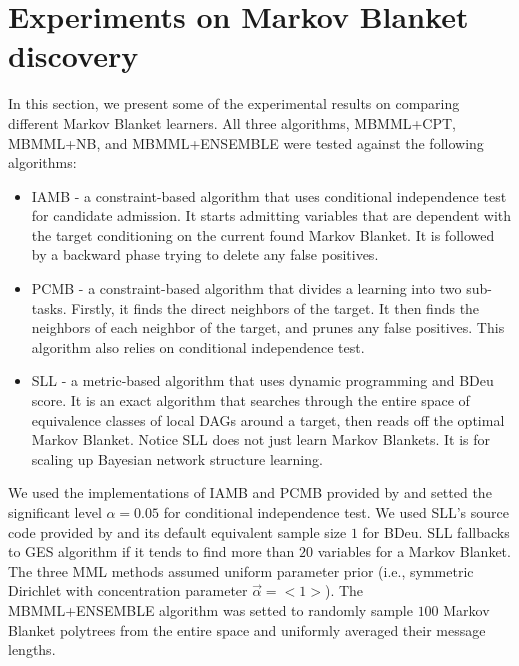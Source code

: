 \documentclass{svmult}
\begin{document}
\section{Experiments on Markov Blanket discovery}
In this section, we present some of the experimental results on comparing different Markov Blanket learners. All three algorithms, MBMML+CPT, MBMML+NB, and MBMML+ENSEMBLE were tested against the following algorithms: 
\begin{itemize}
\item IAMB - a constraint-based algorithm that uses conditional independence test for candidate admission. It starts admitting variables that are dependent with the target conditioning on the current found Markov Blanket. It is followed by a backward phase trying to delete any false positives.  
\item PCMB - a constraint-based algorithm that divides a learning into two sub-tasks. Firstly, it finds the direct neighbors of the target. It then finds the neighbors of each neighbor of the target, and prunes any false positives. This algorithm also relies on conditional independence test. 
\item SLL - a metric-based algorithm that uses dynamic programming and BDeu score. It is an exact algorithm that searches through the entire space of equivalence classes of local DAGs around a target, then reads off the optimal Markov Blanket. Notice SLL does not just learn Markov Blankets. It is for scaling up Bayesian network structure learning. 
\end{itemize}
We used the implementations of IAMB and PCMB provided by \cite{pena2007towards} and setted the significant level $\alpha=0.05$ for conditional independence test. We used SLL's source code provided by \cite{niinimaki2012local} and its default equivalent sample size $1$ for BDeu. SLL fallbacks to GES algorithm \cite{chickering2002learning} if it tends to find more than $20$ variables for a Markov Blanket. The three MML methods assumed uniform parameter prior (i.e., symmetric Dirichlet with concentration parameter $\vec{\alpha} = <1>$). The MBMML+ENSEMBLE algorithm was setted to randomly sample $100$ Markov Blanket polytrees from the entire space and uniformly averaged their message lengths. 
\end{document}
